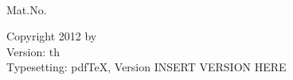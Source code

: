 \thispagestyle{empty}
\vspace*{3\baselineskip}
\noindent
\fullname\\
Mat.No. \matnr\\
\email


\vfill
\noindent
Copyright 2012 by \fullname\\
Version: \thday{}th \thmonth{} \thyear\\
Typesetting: pdfTeX, Version INSERT VERSION HERE



\cleardoublepage

